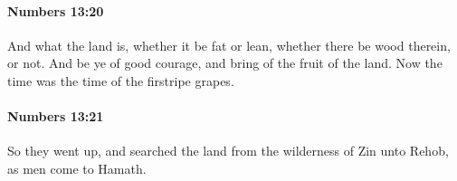 		\paragraph{Numbers 13:20} %
			\label{NUMBERS-13-20}

			And what the land is, whether it be fat or lean, whether there be wood therein, or not. And be ye of good courage, and bring of the fruit of the land. Now the time was the time of the firstripe grapes.


		\paragraph{Numbers 13:21} %
			\label{NUMBERS-13-21}

			So they went up, and searched the land from the wilderness of Zin unto Rehob, as men come to Hamath.


